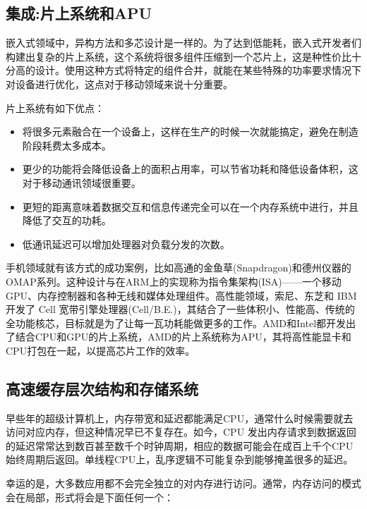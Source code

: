 
\subsection{集成:片上系统和APU}

嵌入式领域中，异构方法和多芯设计是一样的。为了达到低能耗，嵌入式开发者们构建出复杂的片上系统，这个系统将很多组件压缩到一个芯片上，这是种性价比十分高的设计。使用这种方式将特定的组件合并，就能在某些特殊的功率要求情况下对设备进行优化，这点对于移动领域来说十分重要。

片上系统有如下优点：

\begin{itemize}
\item 将很多元素融合在一个设备上，这样在生产的时候一次就能搞定，避免在制造阶段耗费太多成本。
\item 更少的功能将会降低设备上的面积占用率，可以节省功耗和降低设备体积，这对于移动通讯领域很重要。
\item 更短的距离意味着数据交互和信息传递完全可以在一个内存系统中进行，并且降低了交互的功耗。
\item 低通讯延迟可以增加处理器对负载分发的次数。
\end{itemize}

手机领域就有该方式的成功案例，比如高通的金鱼草(Snapdragon)和德州仪器的OMAP系列。这种设计与在ARM上的实现称为指令集架构(ISA)——一个移动GPU、内存控制器和各种无线和媒体处理组件。高性能领域，索尼、东芝和 IBM 开发了 Cell 宽带引擎处理器(Cell/B.E.)，其结合了一些体积小、性能高、传统的全功能核芯，目标就是为了让每一瓦功耗能做更多的工作。AMD和Intel都开发出了结合CPU和GPU的片上系统，AMD的片上系统称为APU，其将高性能显卡和CPU打包在一起，以提高芯片工作的效率。

\subsection{高速缓存层次结构和存储系统}

早些年的超级计算机上，内存带宽和延迟都能满足CPU，通常什么时候需要就去访问对应内存，但这种情况早已不复存在。如今，CPU 发出内存请求到数据返回的延迟常常达到数百甚至数千个时钟周期，相应的数据可能会在成百上千个CPU始终周期后返回。单线程CPU上，乱序逻辑不可能复杂到能够掩盖很多的延迟。

幸运的是，大多数应用都不会完全独立的对内存进行访问。通常，内存访问的模式会在局部，形式将会是下面任何一个：

